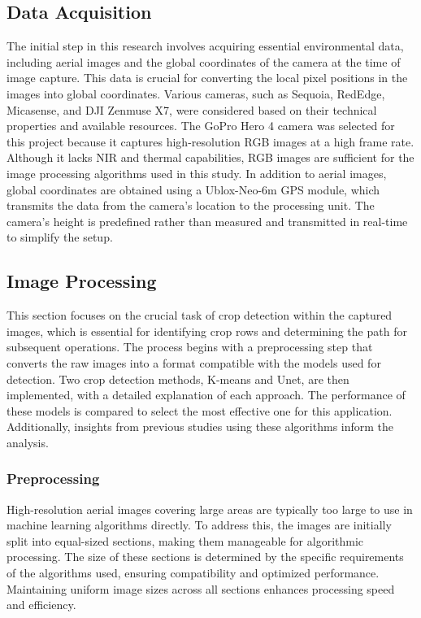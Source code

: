 \documentclass[conference]{IEEEtran}
\begin{document}
\subsection{Data Acquisition}
The initial step in this research involves acquiring essential environmental data, including aerial images and the global coordinates of the camera at the time of image capture. This data is crucial for converting the local pixel positions in the images into global coordinates. Various cameras, such as Sequoia, RedEdge, Micasense, and DJI Zenmuse X7, were considered based on their technical properties and available resources. The GoPro Hero 4 camera was selected for this project because it captures high-resolution RGB images at a high frame rate. Although it lacks NIR and thermal capabilities, RGB images are sufficient for the image processing algorithms used in this study. In addition to aerial images, global coordinates are obtained using a Ublox-Neo-6m GPS module, which transmits the data from the camera’s location to the processing unit. The camera’s height is predefined rather than measured and transmitted in real-time to simplify the setup.


\subsection{Image Processing}
This section focuses on the crucial task of crop detection within the captured images, which is essential for identifying crop rows and determining the path for subsequent operations. The process begins with a preprocessing step that converts the raw images into a format compatible with the models used for detection. Two crop detection methods, K-means and Unet, are then implemented, with a detailed explanation of each approach. The performance of these models is compared to select the most effective one for this application. Additionally, insights from previous studies using these algorithms inform the analysis.



\subsubsection{Preprocessing}
High-resolution aerial images covering large areas are typically too large to use in machine learning algorithms directly. To address this, the images are initially split into equal-sized sections, making them manageable for algorithmic processing. The size of these sections is determined by the specific requirements of the algorithms used, ensuring compatibility and optimized performance. Maintaining uniform image sizes across all sections enhances processing speed and efficiency.
\end{document}
